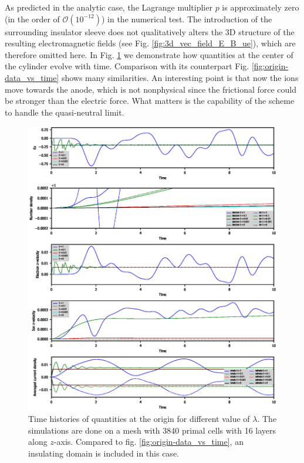 \documentclass{report}
\begin{document}
As predicted in the analytic case, the Lagrange multiplier $p$ is approximately zero (in the order of $\mathcal{O}(10^{-12})$) in the numerical test. The introduction of the surrounding insulator sleeve does not qualitatively alters the 3D structure of the resulting electromagnetic fields (see Fig. \ref{fig:3d_vec_field_E_B_ue}), which are therefore omitted here. In Fig. \ref{fig:time_history_extend} we demonstrate how quantities at the center of the cylinder evolve with time. Comparison with its counterpart Fig. \ref{fig:origin-data_vs_time} shows many similarities. An interesting point is that now the ions move towards the anode, which is not nonphysical since the frictional force could be stronger than the electric force. What matters is the capability of the scheme to handle the quasi-neutral limit.
\begin{figure}
    \centering
    \includegraphics[scale=0.9]{origin_data-vs-time_withInsulator.eps}
    \caption{Time histories of quantities at the origin for different value of $\lambda$. The simulations are done on a mesh with 3840 primal cells with 16 layers along $z$-axis. Compared to fig. \ref{fig:origin-data_vs_time}, an insulating domain is included in this case.}
    \label{fig:time_history_extend}
\end{figure}
\end{document}
